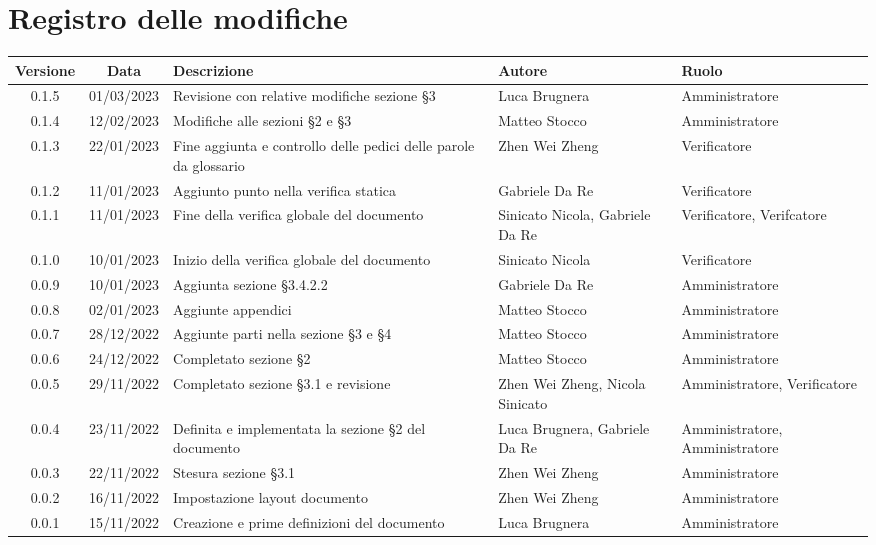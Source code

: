 \section*{Registro delle modifiche}
\begin{center}
\renewcommand\tabularxcolumn[1]{>{\Centering}m{#1}}
\setlength\extrarowheight{5pt}
\begin{tabularx}{\textwidth}{| c | c | X | X | X |} 
\hline
\rowcolor{white}
 \textbf{Versione} & \textbf{Data} & \textbf{Descrizione} & \textbf{Autore} & \textbf{Ruolo}\\
 \hline
 0.1.5 & 01/03/2023 & Revisione con relative modifiche sezione §3 & Luca Brugnera & Amministratore\\
 \hline
 0.1.4 & 12/02/2023 & Modifiche alle sezioni §2 e §3 & Matteo Stocco & Amministratore\\
 \hline
 0.1.3 & 22/01/2023 & Fine aggiunta e controllo delle pedici delle parole da glossario & Zhen Wei Zheng & Verificatore \\
 \hline
 0.1.2 & 11/01/2023 & Aggiunto punto nella verifica statica & Gabriele Da Re & Verificatore\\
 \hline
 0.1.1 & 11/01/2023 & Fine della verifica globale del documento & Sinicato Nicola, Gabriele Da Re & Verificatore, Verifcatore\\
 \hline
 0.1.0 & 10/01/2023 & Inizio della verifica globale del documento & Sinicato Nicola & Verificatore\\
 \hline
 0.0.9 & 10/01/2023 & Aggiunta sezione §3.4.2.2 & Gabriele Da Re & Amministratore\\
 \hline
 0.0.8 & 02/01/2023 & Aggiunte appendici & Matteo Stocco & Amministratore\\
 \hline
 0.0.7 & 28/12/2022 & Aggiunte parti nella sezione §3 e §4 & Matteo Stocco & Amministratore\\
 \hline
 0.0.6 & 24/12/2022 & Completato sezione §2 & Matteo Stocco & Amministratore\\
 \hline
 0.0.5 & 29/11/2022 & Completato sezione §3.1 e revisione & Zhen Wei Zheng, Nicola Sinicato & Amministratore, Verificatore\\
 \hline
 0.0.4 & 23/11/2022 &  Definita e implementata la sezione §2 del documento & Luca Brugnera, Gabriele Da Re & Amministratore, Amministratore\\
 \hline
 0.0.3 & 22/11/2022 & Stesura sezione §3.1 & Zhen Wei Zheng & Amministratore\\
 \hline
 0.0.2 & 16/11/2022 & Impostazione layout documento & Zhen Wei Zheng & Amministratore\\
 \hline
 0.0.1 & 15/11/2022 & Creazione e prime definizioni del documento & Luca Brugnera & Amministratore\\
 \hline
\end{tabularx}
\end{center}
